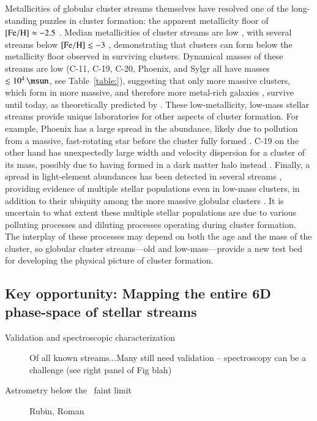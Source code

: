 \documentclass[final,5p,times,twocolumn,authoryear]{elsarticle}
\begin{document}
Metallicities of globular cluster streams themselves have resolved one of the long-standing puzzles in cluster formation: the apparent metallicity floor of ${[\mathrm{Fe}/\mathrm{H}]}\approx-2.5$ \citep[e.g.,][]{harris:1996,harris:2010,beasley:2019}.
Median metallicities of cluster streams are low \citep[$\feh\lesssim-1$,][]{martin:2022b}, with several streams below ${[\mathrm{Fe}/\mathrm{H}]}\lesssim-3$ \citep{roederer:2019,wan:2020,martin:2022a}, demonstrating that clusters can form below the metallicity floor observed in surviving clusters.
Dynamical masses of these streams are low (C-11, C-19, C-20, Phoenix, and Sylgr all have masses $\lesssim10^4\,\unit{\msun}$, see Table~\ref{table:}), suggesting that only more massive clusters, which form in more massive, and therefore more metal-rich galaxies \citep[e.g.,][]{maiolino:2019}, survive until today, as theoretically predicted by \citet{kruijssen:2019}.
These low-metallicity, low-mass stellar streams provide unique laboratories for other aspects of cluster formation.
For example, Phoenix has a large spread in the  abundance, likely due to pollution from a massive, fast-rotating star before the cluster fully formed \citep{casey:2021}.
C-19 on the other hand has unexpectedly large width and velocity dispersion for a cluster of its mass, possibly due to having formed in a dark matter halo instead \citep{errani:2022}.
Finally, a spread in light-element abundances has been detected in several streams \citep{martin:2022a,balbinot:2022,usman:2024}, providing evidence of multiple stellar populations even in low-mass clusters, in addition to their ubiquity among the more massive globular clusters \citep[e.g.,][]{gratton:2012}.
It is uncertain to what extent these multiple stellar populations are due to various polluting processes \citep[e.g., massive AGB stars, fast-rotating massive stars, supermassive stars,][]{bastian:2018} and diluting processes \citep[e.g., stellar mass-loss, interactive binaries, re-accretion,][]{gratton:2019} operating during cluster formation.
The interplay of these processes may depend on both the age and the mass of the cluster, so globular cluster streams---old and low-mass---provide a new test bed for developing the physical picture of cluster formation.

\subsection{Key opportunity: Mapping the entire 6D phase-space of stellar streams}
\begin{description}
    \item[Validation and spectroscopic characterization] Of all known streams...Many still need validation -- spectroscopy can be a challenge (see right panel of Fig blah)
    \item[Astrometry below the \gaia\ faint limit] Rubin, Roman
\end{description}
\end{document}
